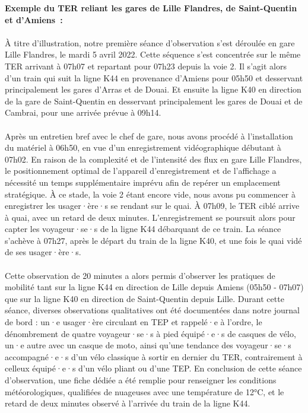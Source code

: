 \begin{refsegment}
    \begin{tcolorbox}[colback=white!5!white,
                      colframe=blue!75!blue, 
                      title=
                      \bigskip
                      \center{Illustration d'une séance d'observation quantitative}
                      \bigskip]
\normalsize{\textbf{Exemple du \acrshort{TER} reliant les gares de Lille Flandres, de Saint-Quentin et d'Amiens~:}}
    \\\\
\small{À titre d'illustration, notre première séance d'observation s'est déroulée en gare Lille Flandres, le mardi 5 avril 2022. Cette séquence s'est concentrée sur le même \acrshort{TER} arrivant à 07h07 et repartant pour 07h23 depuis la voie 2. Il s'agit alors d'un train qui suit la ligne K44 en provenance d'Amiens pour 05h50 et desservant principalement les gares d'Arras et de Douai. Et ensuite la ligne K40 en direction de la gare de Saint-Quentin en desservant principalement les gares de Douai et de Cambrai, pour une arrivée prévue à 09h14.}
    \\\\
\small{Après un entretien bref avec le chef de gare, nous avons procédé à l'installation du matériel à 06h50, en vue d'un enregistrement vidéographique débutant à 07h02. En raison de la complexité et de l'intensité des flux en gare Lille Flandres, le positionnement optimal de l'appareil d'enregistrement et de l'affichage a nécessité un temps supplémentaire imprévu afin de repérer un emplacement stratégique. À ce stade, la voie 2 étant encore vide, nous avons pu commencer à enregistrer les usager·ère·s se rendant sur le quai. À 07h09, le \acrshort{TER} ciblé arrive à quai, avec un retard de deux minutes. L'enregistrement se poursuit alors pour capter les voyageur·se·s de la ligne K44 débarquant de ce train. La séance s'achève à 07h27, après le départ du train de la ligne K40, et une fois le quai vidé de ses usager·ère·s.}
    \\\\
\small{Cette observation de 20 minutes a alors permis d'observer les pratiques de mobilité tant sur la ligne K44 en direction de Lille depuis Amiens (05h50 - 07h07) que sur la ligne K40 en direction de Saint-Quentin depuis Lille. Durant cette séance, diverses observations qualitatives ont été documentées dans notre journal de bord : un·e usager·ère circulant en \acrfull{TEP} et rappelé·e à l'ordre, le dénombrement de quatre voyageur·se·s à pied équipé·e·s de casques de vélo, un·e autre avec un casque de moto, ainsi qu'une tendance des voyageur·se·s accompagné·e·s d'un vélo classique à sortir en dernier du \acrshort{TER}, contrairement à celleux équipé·e·s d'un vélo pliant ou d'une \acrshort{TEP}. En conclusion de cette séance d'observation, une fiche dédiée a été remplie pour renseigner les conditions météorologiques, qualifiées de nuageuses avec une température de 12°C, et le retard de deux minutes observé à l'arrivée du train de la ligne K44.}
    \end{tcolorbox}


\end{refsegment}
